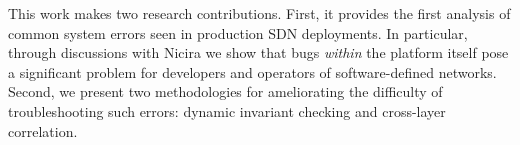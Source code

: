 This work makes two research contributions. First, it provides the first
analysis of common system errors seen in production SDN deployments. In
particular, through discussions with Nicira we show that bugs {\it within} the platform
itself pose a significant problem for developers and operators of software-defined
networks. Second, we present two methodologies for ameliorating the difficulty of
troubleshooting such errors: dynamic invariant checking and cross-layer
correlation.
